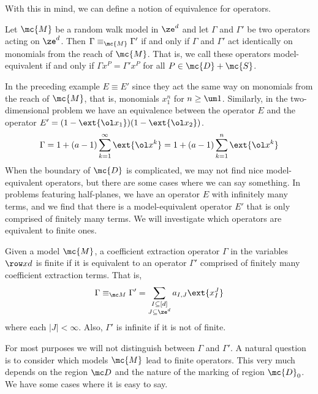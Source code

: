 With this in mind, we can define a notion of equivalence for operators.
\begin{definition} Let $\mc{M}$ be a random walk model in $\ze^d$ and let $\Gamma$ and $\Gamma'$ be two operators acting on $\ze^d$. Then $\Gamma \equiv_{\mc{M}} \Gamma'$ if and only if $\Gamma$ and $\Gamma'$ act identically on monomials from the reach of $\mc{M}$. That is, we call these operators model-equivalent if and only if $\Gamma  x^P = \Gamma' x^P$ for all $P\in \mc{D}+\mc{S}$.
\end{definition}
In the preceding example $E\equiv E'$ since they act the same way on monomials from the reach of $\mc{M}$, that is, monomials $x_1^n$ for $n\ge \um 1$. Similarly, in the two-dimensional problem we have an equivalence between the operator $E$ and the operator $E' = (1-\ext{\ol x_1})(1-\ext{\ol x_2})$.
\begin{align}
	\Gamma = 1 + (a-1)\sum_{k=1}^{\infty} \ext{\ol x^k} = 1 + (a-1)\sum_{k=1}^{n} \ext{\ol x^k}
\end{align}
When the boundary of $\mc{D}$ is complicated, we may not find nice model-equivalent operators, but there are some cases where we can say something. In problems featuring half-planes, we have an operator $E$ with infinitely many terms, and we find that there is a model-equivalent operator $E'$ that is only comprised of finitely many terms. We will investigate which operators are equivalent to finite ones.
\begin{definition} Given a model $\mc{M}$, a coefficient extraction operator $\Gamma$ in the variables $\row xd$ is finite if it is equivalent to an operator $\Gamma'$ comprised of finitely many coefficient extraction terms. That is,
\begin{align}
	\Gamma \equiv_{\mc M} \Gamma' = \sum_{\substack{I\subseteq [d]\\ J \subseteq \ze^d}}a_{I,J} \ext{x_I^J}
\end{align}
where each $|J| < \infty$. Also, $\Gamma'$ is infinite if it is not of finite.
\end{definition}
For most purposes we will not distinguish between $\Gamma$ and $\Gamma'$. A natural question is to consider which models $\mc{M}$ lead to finite operators. This very much depends on the region $\mc D$ and the nature of the marking of region $\mc{D}_0$. We have some cases where it is easy to say.

